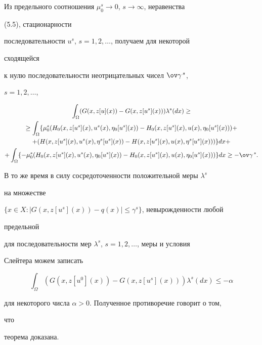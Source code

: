 \begin{pf}
Из предельного соотношения $\mu^s_0\to0$, $s\to\infty$, неравенства 


(5.5), стационарности 


последовательности $u^s$, $s=1,2,\dotsc$, получаем для некоторой 


сходящейся 


к нулю последовательности неотрицательных чисел $\ov\gamma^{\,s}$, 


$s=1,2,\dotsc$, 


\begin{multline*} 


\int_\Omega(G(x,z[u](x))-G(x,z[u^s](x)))\lambda^s(dx)\ge \\ 


%


\ge\int_\Omega\{\mu^s_0(H_0(x,z[u^s](x),u^s(x),\eta_0[u^s](x))- 


H_0(x,z[u^s](x),u(x),\eta_0[u^s](x)))+ \\ 


%


+(H(x,z[u^s](x),u^s(x),\eta^s[u^s](x))- 


H(x,z[u^s](x),u(x),\eta^s[u^s](x)))\}dx+ \\


%


+\int_\Omega\{-\mu^s_0(H_0(x,z[u^s](x),u^s(x),\eta_0[u^s](x))- 


H_0(x,z[u^s](x),u(x),\eta_0[u^s](x)))\}dx\ge-\ov\gamma^{\,s}. 


\end{multline*} 


В то же время в силу сосредоточенности положительной меры $\lambda^s$ 


на множестве 


$\{x\in X:|G(x,z[u^s](x))-q(x)|\le\gamma^s\}$, невырожденности любой 


предельной 


для последовательности мер $\lambda^s$, $s=1,2,\dotsc$, меры и условия 


Слейтера можем записать 


$$ 


\int_\Omega(G(x,z[u^0](x))-G(x,z[u^s](x)))\lambda^s(dx)\le-\alpha 


$$ 


для некоторого числа $\alpha>0$. Полученное противоречие говорит о том, 


что 


теорема доказана. 


\end{pf} 





